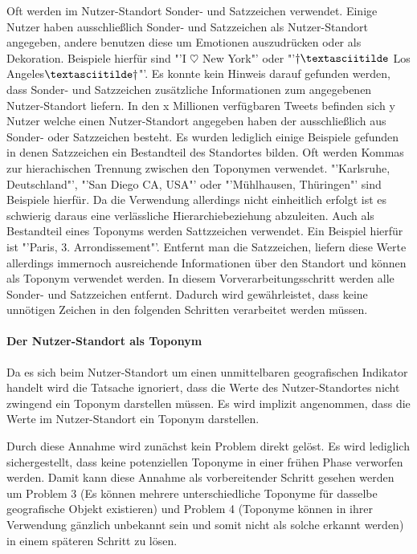 						Oft werden im Nutzer-Standort Sonder- und Satzzeichen verwendet. 
						Einige Nutzer haben ausschließlich Sonder- und Satzzeichen als Nutzer-Standort angegeben, andere benutzen diese um Emotionen auszudrücken oder als Dekoration. 
						Beispiele hierfür sind "'I $\heartsuit$ New York"' oder "'$\dagger\textasciitilde$ Los Angeles$\textasciitilde\dagger$"'.
						Es konnte kein Hinweis darauf gefunden werden, dass Sonder- und Satzzeichen zusätzliche Informationen zum angegebenen Nutzer-Standort liefern. 
						In den x Millionen verfügbaren Tweets befinden sich y Nutzer welche einen Nutzer-Standort angegeben haben der ausschließlich aus Sonder- oder Satzzeichen besteht. 
						Es wurden lediglich einige Beispiele gefunden in denen Satzzeichen ein Bestandteil des Standortes bilden.
						Oft werden Kommas zur hierachischen Trennung zwischen den Toponymen verwendet.
						"'Karlsruhe, Deutschland"', "'San Diego CA, USA"' oder "'Mühlhausen, Thüringen"' sind Beispiele hierfür.
						Da die Verwendung allerdings nicht einheitlich erfolgt ist es schwierig daraus eine verlässliche Hierarchiebeziehung abzuleiten.
						Auch als Bestandteil eines Toponyms werden Sattzzeichen verwendet.
						Ein Beispiel hierfür ist "'Paris, 3. Arrondissement"'.
						Entfernt man die Satzzeichen, liefern diese Werte allerdings immernoch ausreichende Informationen über den Standort und können als Toponym verwendet werden.  
						In diesem Vorverarbeitungsschritt werden alle Sonder- und Satzzeichen entfernt. 
						Dadurch wird gewährleistet, dass keine unnötigen Zeichen in den folgenden Schritten verarbeitet werden müssen. 

					\paragraph{Der Nutzer-Standort als Toponym} 

						Da es sich beim Nutzer-Standort um einen unmittelbaren geografischen Indikator handelt wird die Tatsache ignoriert, dass die Werte des Nutzer-Standortes nicht zwingend ein Toponym darstellen müssen. 
						Es wird implizit angenommen, dass die Werte im Nutzer-Standort ein Toponym darstellen.
						
						
						Durch diese Annahme wird zunächst kein Problem direkt gelöst. 
						Es wird lediglich sichergestellt, dass keine potenziellen Toponyme in einer frühen Phase verworfen werden. 
						Damit kann diese Annahme als vorbereitender Schritt gesehen werden um Problem 3 (Es können mehrere unterschiedliche Toponyme für dasselbe geografische Objekt existieren) und Problem 4 (Toponyme können in ihrer Verwendung gänzlich unbekannt sein und somit nicht als solche erkannt werden) in einem späteren Schritt zu lösen. 

